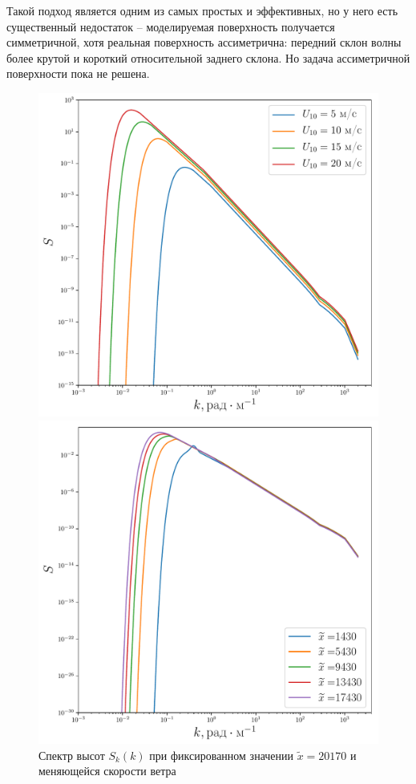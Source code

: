 Такой подход является одним из самых простых и эффективных, но у него есть существенный недостаток -- моделируемая поверхность получается симметричной, хотя реальная поверхность ассиметрична: передний склон волны более крутой и короткий относительной заднего склона. Но задача ассиметричной поверхности пока не решена. 
\begin{figure}[h!]
	\begin{minipage}{0.49\linewidth}
			\centering
			\includegraphics[width=\linewidth]{fig/full_spectrum1.pdf}
			\caption{Спектр высот $S_k(k)$ при фиксированном значении $\tilde x=20170$ и меняющейся скорости ветра}		
			\label{fig:full_spectrum1}
	\end{minipage}
	\hfill
	\begin{minipage}{0.49\linewidth}
			\centering
			\includegraphics[width=\linewidth]{fig/full_spectrum2.pdf}

\end{minipage}
\end{figure}
